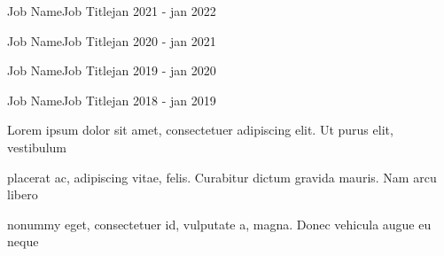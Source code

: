 \documentclass{resume}
\begin{document}
\begin{job}{Job Name}{Job Title}{jan 2021 - jan 2022}
    \lipsum[2]
\end{job}

\begin{job}{Job Name}{Job Title}{jan 2020 - jan 2021}
    \lipsum[7]
\end{job}

\begin{job}{Job Name}{Job Title}{jan 2019 - jan 2020}
    \lipsum[2]
\end{job}

\begin{job}{Job Name}{Job Title}{jan 2018 - jan 2019}
    \lipsum[7]
    \begin{qualifications}
        \item Lorem ipsum dolor sit amet, consectetuer adipiscing elit. Ut purus elit, vestibulum
        \item placerat ac, adipiscing vitae, felis. Curabitur dictum gravida mauris. Nam arcu libero
        \item nonummy eget, consectetuer id, vulputate a, magna. Donec vehicula augue eu neque
    \end{qualifications}    
\end{job}
\end{document}
